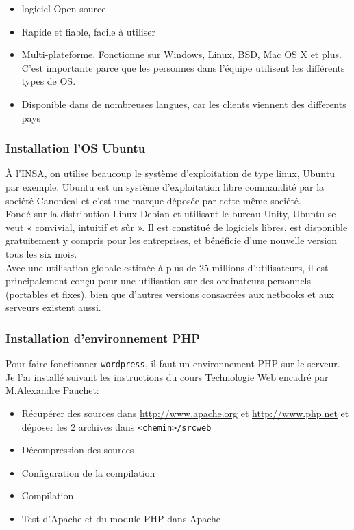 \begin{itemize}
\item logiciel Open-source
\item Rapide et fiable, facile à utiliser
\item Multi-plateforme. Fonctionne sur Windows, Linux, BSD, Mac OS X et plus. C'est importante parce que les personnes dans l'équipe utilisent les différents types de OS.
\item Disponible dans de nombreuses langues, car les clients viennent des differents pays
\end{itemize}


     \subsubsection{Installation l'OS Ubuntu}
À l'INSA, on utilise beaucoup le système d'exploitation de type linux, Ubuntu par exemple.
Ubuntu est un système d’exploitation libre commandité par la société Canonical et c'est une marque déposée par cette même société.\\

Fondé sur la distribution Linux Debian et utilisant le bureau Unity, Ubuntu se veut « convivial, intuitif et sûr ». Il est constitué de logiciels libres, est disponible gratuitement y compris pour les entreprises, et bénéficie d'une nouvelle version tous les six mois.\\

Avec une utilisation globale estimée à plus de 25 millions d'utilisateurs, il est principalement conçu pour une utilisation sur des ordinateurs personnels (portables et fixes), bien que d'autres versions consacrées aux netbooks et aux serveurs existent aussi. \\

     \subsubsection{Installation d'environnement PHP}
Pour faire fonctionner \texttt{wordpress}, il faut un environnement PHP sur le serveur.
Je l'ai installé suivant les instructions du cours Technologie Web encadré par M.Alexandre Pauchet:\\
 
\begin{itemize}
\item Récupérer des sources dans \url{http://www.apache.org} et \url{http://www.php.net} et déposer les 2 archives dans \texttt{<chemin>/srcweb}
\item Décompression des sources
\item Configuration de la compilation
\item Compilation
\item Test d'Apache et du module PHP dans Apache
\end{itemize}

